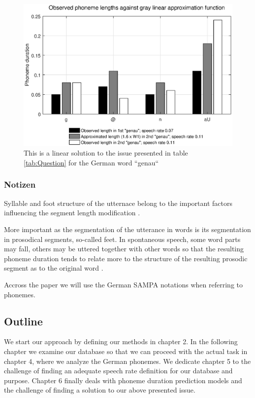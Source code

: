 \documentclass[a4paper]{scrreprt}
\begin{document}
\begin{figure}[htbp]
	\centering
	\includegraphics[scale=0.7]{../Graphen/Linear_approx.eps}
	\caption[Linear phoneme duration approximation]{This is a linear solution to the issue presented in table \ref{tab:Question} for the German word ``genau``}
	\label{fig:linear_approx}
\end{figure}

\subsubsection*{Notizen}
Syllable and foot structure of the utternace belong to the important factors influencing the segment length modification  \cite{Hoequist1986}.

More important as the segmentation of the utterance in words is its segmentation in prosodical segments, so-called feet. In spontaneous speech, some word parts may fall, others may be uttered together with other words so that the resulting phoneme duration tends to relate more to the structure of the resulting prosodic segment as to the original word \cite{Kohler1986}. 

Accross the paper we will use the German SAMPA notations when referring to phonemes.

\subsection*{Outline}
We start our approach by defining our methods in chapter 2. In the following chapter we examine our database so that we can proceed with the actual task in chapter 4, where we analyze the German phonemes. We dedicate chapter 5 to the challenge of finding an adequate speech rate definition for our database and purpose. Chapter 6 finally deals with phoneme duration prediction models and the challenge of finding a solution to our above presented issue.
\end{document}
